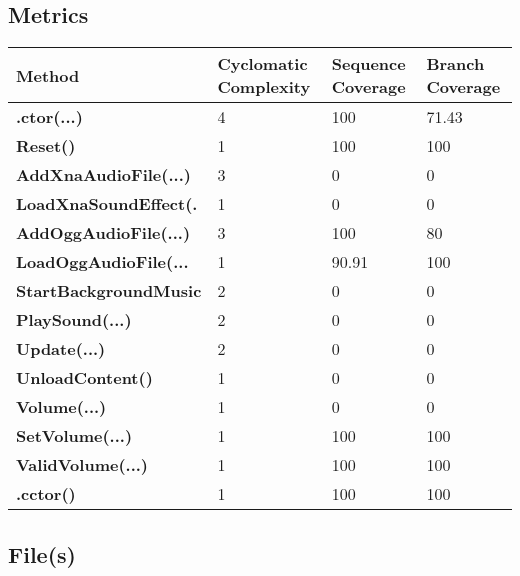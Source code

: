 \documentclass[a4paper,10pt]{article}
\begin{document}
\subsection{Metrics}
\begin{longtable}[l]{|l|l|l|l|}
\hline
\textbf{Method} & \textbf{Cyclomatic Complexity} & \textbf{Sequence Coverage} & \textbf{Branch Coverage}\\
\hline
\textbf{.ctor(...)} & 4 & 100 & 71.43\\
\hline
\textbf{Reset()} & 1 & 100 & 100\\
\hline
\textbf{AddXnaAudioFile(...)} & 3 & 0 & 0\\
\hline
\textbf{LoadXnaSoundEffect(.} & 1 & 0 & 0\\
\hline
\textbf{AddOggAudioFile(...)} & 3 & 100 & 80\\
\hline
\textbf{LoadOggAudioFile(...} & 1 & 90.91 & 100\\
\hline
\textbf{StartBackgroundMusic} & 2 & 0 & 0\\
\hline
\textbf{PlaySound(...)} & 2 & 0 & 0\\
\hline
\textbf{Update(...)} & 2 & 0 & 0\\
\hline
\textbf{UnloadContent()} & 1 & 0 & 0\\
\hline
\textbf{Volume(...)} & 1 & 0 & 0\\
\hline
\textbf{SetVolume(...)} & 1 & 100 & 100\\
\hline
\textbf{ValidVolume(...)} & 1 & 100 & 100\\
\hline
\textbf{.cctor()} & 1 & 100 & 100\\
\hline
\end{longtable}
\subsection{File(s)}
\end{document}
